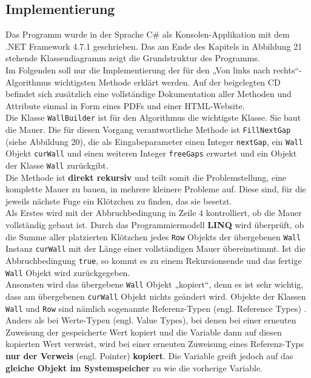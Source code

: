 \documentclass[a4paper,12pt]{article}
\newcommand{\code}{\texttt}
\begin{document}
\subsection{Implementierung}
Das Programm wurde in der Sprache C\# als Konsolen-Applikation mit dem .NET Framework 4.7.1 geschrieben.
Das am Ende des Kapitels in Abbildung 21 stehende Klassendiagramm zeigt die Grundstruktur des Programms.
\\[0.4cm]
Im Folgenden soll nur die Implementierung der für den „Von links nach rechts“-Algorithmus wichtigsten Methode erklärt werden. Auf der beigelegten CD befindet sich zusätzlich eine vollständige Dokumentation aller Methoden und Attribute einmal in Form eines PDFs und einer HTML-Website.
\\[0.4cm]
Die Klasse \code{WallBuilder} ist für den Algorithmus die wichtigste Klasse. Sie baut die Mauer. Die für diesen Vorgang verantwortliche Methode ist \code{FillNextGap} (siehe Abbildung 20), die als Eingabeparameter einen Integer \code{nextGap}, ein \code{Wall} Objekt \code{curWall} und einen weiteren Integer \code{freeGaps} erwartet und ein Objekt der Klasse \code{Wall} zurückgibt.
\\[0.4cm]
Die Methode ist \textbf{direkt rekursiv} und teilt somit die Problemstellung, eine komplette Mauer zu bauen, in mehrere kleinere Probleme auf. Diese sind, für die jeweils nächste Fuge ein Klötzchen zu finden, das sie besetzt.
\\[0.4cm]
Als Erstes wird mit der Abbruchbedingung in Zeile 4 kontrolliert, ob die Mauer vollständig gebaut ist. Durch das Programmiermodell \textbf{LINQ} \citep{csharp6} wird überprüft, ob die Summe aller platzierten Klötzchen jedes \code{Row} Objekts der übergebenen \code{Wall} Instanz \code{curWall} mit der Länge einer vollständigen Mauer übereinstimmt.
Ist die Abbruchbedingung \code{true}, so kommt es zu einem Rekursionsende und das fertige \code{Wall} Objekt wird zurückgegeben.
\\[0.4cm]
Ansonsten wird das übergebene \code{Wall} Objekt „kopiert“, denn es ist sehr wichtig, dass am übergebenen \code{curWall} Objekt nichts geändert wird. Objekte der Klassen \code{Wall} und \code{Row} sind nämlich sogenannte Referenz-Typen (engl. Reference Types) \cite{reference_types}. Anders als bei Werte-Typen (engl. Value Types), bei denen bei einer erneuten Zuweisung der gespeicherte Wert kopiert und die Variable dann auf diesen kopierten Wert verweist, wird bei einer erneuten Zuweisung eines Referenz-Typs \textbf{nur der Verweis} (engl. Pointer) \textbf{kopiert}. Die Variable greift jedoch auf das \textbf{gleiche Objekt im Systemspeicher} zu wie die vorherige Variable.
\end{document}
